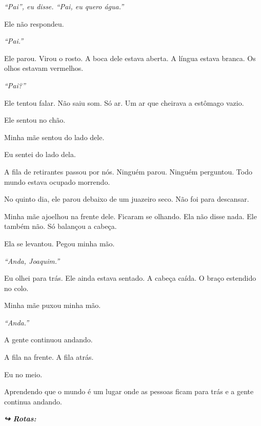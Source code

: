 \noindent \textit{\textquotedblleft{}Pai\textquotedblright{}\textit{, eu disse. }\textquotedblleft{}Pai, eu quero água.\textquotedblright{}}

\noindent Ele não respondeu.

\noindent \textit{\textquotedblleft{}Pai.\textquotedblright{}}

\noindent Ele parou. Virou o rosto. A boca dele estava aberta. A língua estava branca. Os olhos estavam vermelhos.

\noindent \textit{\textquotedblleft{}Pai?\textquotedblright{}}

\noindent Ele tentou falar. Não saiu som. Só ar. Um ar que cheirava a estômago vazio.

\noindent Ele sentou no chão.

\noindent Minha mãe sentou do lado dele.

\noindent Eu sentei do lado dela.

\noindent A fila de retirantes passou por nós. Ninguém parou. Ninguém perguntou. Todo mundo estava ocupado morrendo.

\noindent No quinto dia, ele parou debaixo de um juazeiro seco. Não foi para descansar.

\noindent Minha mãe ajoelhou na frente dele. Ficaram se olhando. Ela não disse nada. Ele também não. Só balançou a cabeça.

\noindent Ela se levantou. Pegou minha mão.

\noindent \textit{\textquotedblleft{}Anda, Joaquim.\textquotedblright{}}

\noindent Eu olhei para trás. Ele ainda estava sentado. A cabeça caída. O braço estendido no colo.

\noindent Minha mãe puxou minha mão.

\noindent \textit{\textquotedblleft{}Anda.\textquotedblright{}}

\noindent A gente continuou andando.

\noindent A fila na frente. A fila atrás.

\noindent Eu no meio.

\noindent Aprendendo que o mundo é um lugar onde as pessoas ficam para trás e a gente continua andando.

\vspace{0.5em}
\noindent\textit{\textbf{↪ Rotas:}  \rotasep {} \rotasep {}}